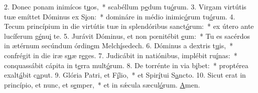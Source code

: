2. Donec ponam inimícos t\uline{u}os,~* scabéllum p\uline{e}dum tu\uline{ó}rum.
3. Virgam virtútis tuæ emíttet Dóminus ex S\uline{i}on:~* domináre in médio inimic\uline{ó}rum tu\uline{ó}rum.
4. Tecum princípium in die virtútis tuæ in splendóribus sanct\uline{ó}rum:~* ex útero ante lucíferum g\uline{é}nu\uline{i} te.
5. Jurávit Dóminus, et non pœnitébit \uline{e}um:~* Tu es sacérdos in ætérnum secúndum órdin\uline{e}m Melch\uline{í}sedech.
6. Dóminus a dextris t\uline{u}is,~* confrégit in die iræ s\uline{u}æ r\uline{e}ges.
7. Judicábit in natiónibus, implébit ru\uline{í}nas:~* conquassábit cápita in t\uline{e}rra mult\uline{ó}rum.
8. De torrénte in via b\uline{i}bet:~* proptérea exalt\uline{á}bit c\uline{a}put.
9. Glória Patri, et F\uline{í}lio,~* et Spir\uline{í}tui S\uline{a}ncto.
10. Sicut erat in princípio, et nunc, et s\uline{e}mper,~* et in sǽcula sæcul\uline{ó}rum. \uline{A}men.
